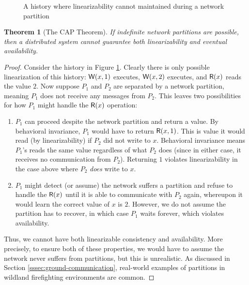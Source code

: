 \documentclass[]             %
{NASA}                       %
\newtheorem{theorem}{Theorem}[section]
\theoremstyle{definition}
\begin{document}
\begin{figure}
  
  \caption{A history where linearizability cannot maintained during a network partition}
  \label{fig:dsm-cap-example-1}
\end{figure}

\begin{theorem}[The CAP Theorem]
  \label{thm:cap}
  If indefinite network partitions are possible, then a distributed
  system cannot guarantee both linearizability and
  eventual availability.
\end{theorem}
\begin{proof}
  Consider the history in Figure \ref{fig:dsm-cap-example-1}. Clearly
  there is only possible linearization of this history:
  $\mathsf{W}\!\left(x, 1\right)$ executes, $\mathsf{W}\!\left(x, 2\right)$ executes, and
  $\mathsf{R}\!\left(x\right)$ reads the value $2$. Now suppose $P_1$ and $P_2$ are
  separated by a network partition, meaning $P_1$ does not receive any
  messages from $P_2$. This leaves two possibilities for how $P_1$
  might handle the $\mathsf{R}\!\left(x\right)$ operation:
  \begin{enumerate}
  \item $P_1$ can proceed despite the network partition and return a
    value. By behavioral invariance, $P_1$ would have to return
    $\mathsf{R}\!\left(x, 1\right)$. This is value it would read (by
    linearizability) if $P_2$ did not write to $x$. Behavioral
    invariance means $P_1$'s reads the same value regardless of what
    $P_2$ does (since in either case, it receives no communication
    from $P_2$). Returning $1$ violates linearizability in the case
    above where $P_2$ \emph{does} write to $x$.
  \item $P_1$ might detect (or assume) the network suffers a partition
    and refuse to handle the $\mathsf{R}\!\left(x\right)$ until it is able to
    communicate with $P_2$ again, whereupon it would learn the correct
    value of $x$ is $2$. However, we do not assume the partition has
    to recover, in which case $P_1$ waits forever, which violates
    availability.
  \end{enumerate}
  Thus, we cannot have both linearizable consistency and
  availability. More precisely, to ensure both of these properties, we
  would have to assume the network never suffers from partitions, but
  this is unrealistic. As discussed in Section
  \ref{sssec:ground-communication}, real-world examples of partitions
  in wildland firefighting environments are common.
\end{proof}
\end{document}
